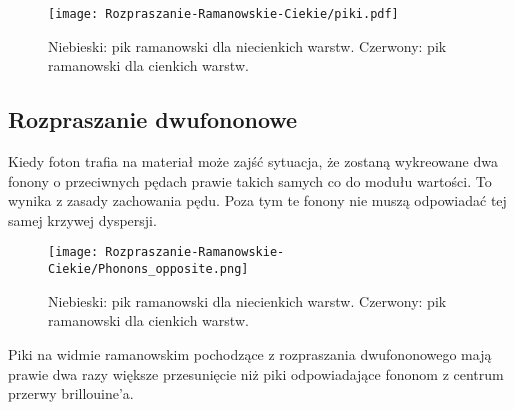 \begin{figure}[H]
	\begin{center}
		\texttt{[image: Rozpraszanie-Ramanowskie-Ciekie/piki.pdf]}
		\caption{Niebieski: pik ramanowski dla niecienkich warstw. Czerwony: pik ramanowski dla cienkich warstw.}
	\end{center}
\end{figure}

\subsection{Rozpraszanie dwufononowe}
Kiedy foton trafia na materiał może zajść sytuacja, że zostaną wykreowane dwa fonony o przeciwnych pędach prawie takich samych co do modułu wartości. To wynika z zasady zachowania pędu. Poza tym te fonony nie muszą odpowiadać tej samej krzywej dyspersji. 
 
\begin{figure}[H]
	\begin{center}
		\texttt{[image: Rozpraszanie-Ramanowskie-Ciekie/Phonons\_opposite.png]}
		\caption{Niebieski: pik ramanowski dla niecienkich warstw. Czerwony: pik ramanowski dla cienkich warstw.}
	\end{center}
\end{figure}

Piki na widmie ramanowskim pochodzące z rozpraszania dwufononowego mają prawie dwa razy większe przesunięcie niż piki odpowiadające fononom z centrum przerwy brillouine'a. 
